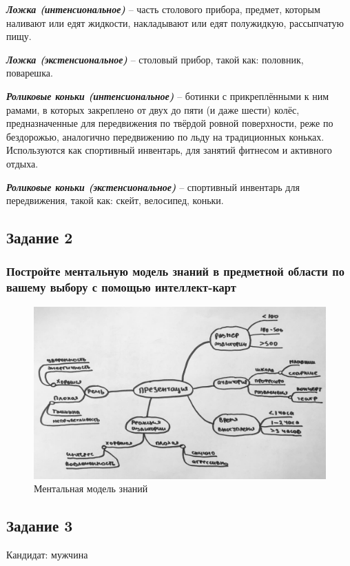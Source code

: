\documentclass[14pt,a4paper,report]{report}
\begin{document}
\emph{\textbf{Ложка (интенсиональное)}} -- часть столового прибора, предмет, которым наливают или едят жидкости, накладывают или едят полужидкую, рассыпчатую пищу.

\emph{\textbf{Ложка (экстенсиональное)}} -- столовый прибор, такой как: половник, поварешка.

\emph{\textbf{Роликовые коньки (интенсиональное)}} -- ботинки с прикреплёнными к ним рамами, в которых закреплено от двух до пяти (и даже шести) колёс, предназначенные для передвижения по твёрдой ровной поверхности, реже по бездорожью, аналогично передвижению по льду на традиционных коньках. Используются как спортивный инвентарь, для занятий фитнесом и активного отдыха.

\emph{\textbf{Роликовые коньки (экстенсиональное)}} -- спортивный инвентарь для передвижения, такой как: скейт, велосипед, коньки.

\subsection{Задание 2}

\subsubsection{Постройте ментальную модель знаний в предметной области по вашему выбору с помощью интеллект-карт}

\begin{figure}[h!]
\centering
\includegraphics[scale = 0.35]{images/mindmap.jpg}
\caption{Ментальная модель знаний}
\label{image:1}
\end{figure}

\subsection{Задание 3}
Кандидат: мужчина
\end{document}
